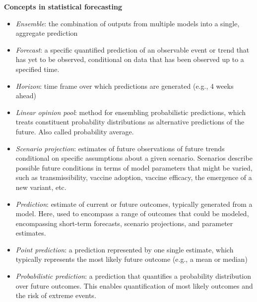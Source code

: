 \documentclass[
]{article}
\begin{document}
\begin{tcolorbox}[enhanced jigsaw, toptitle=1mm, rightrule=.15mm, opacitybacktitle=0.6, titlerule=0mm, colback=white, leftrule=.75mm, title=\textcolor{quarto-callout-tip-color}{\faLightbulb}\hspace{0.5em}{Keywords and Definitions}, breakable, toprule=.15mm, arc=.35mm, colframe=quarto-callout-tip-color-frame, coltitle=black, colbacktitle=quarto-callout-tip-color!10!white, opacityback=0, left=2mm, bottomrule=.15mm, bottomtitle=1mm]

\textbf{Concepts in statistical forecasting}

\begin{itemize}
\item
  \emph{Ensemble}: the combination of outputs from multiple models into
  a single, aggregate prediction
\item
  \emph{Forecast}: a specific quantified prediction of an observable
  event or trend that has yet to be observed, conditional on data that
  has been observed up to a specified time.
\item
  \emph{Horizon}: time frame over which predictions are generated (e.g.,
  4 weeks ahead)
\item
  \emph{Linear opinion pool}: method for ensembling probabilistic
  predictions, which treats constituent probability distributions as
  alternative predictions of the future. Also called probability
  average.
\item
  \emph{Scenario projection}: estimates of future observations of future
  trends conditional on specific assumptions about a given scenario.
  Scenarios describe possible future conditions in terms of model
  parameters that might be varied, such as transmissibility, vaccine
  adoption, vaccine efficacy, the emergence of a new variant, etc.
\item
  \emph{Prediction}: estimate of current or future outcomes, typically
  generated from a model. Here, used to encompass a range of outcomes
  that could be modeled, encompassing short-term forecasts, scenario
  projections, and parameter estimates.
\item
  \emph{Point prediction}: a prediction represented by one single
  estimate, which typically represents the most likely future outcome
  (e.g., a mean or median)
\item
  \emph{Probabilistic prediction}: a prediction that quantifies a
  probability distribution over future outcomes. This enables
  quantification of most likely outcomes and the risk of extreme events.

\end{itemize}
\end{tcolorbox}
\end{document}
